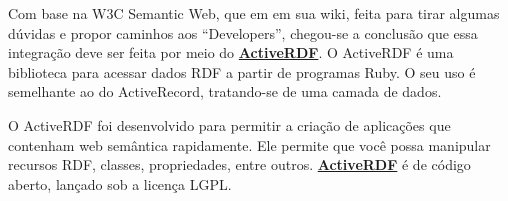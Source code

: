 	Com base na W3C Semantic Web, que em em sua wiki, feita para tirar algumas dúvidas e propor caminhos aos “Developers”, chegou-se a conclusão que essa integração deve ser feita por meio do \href{http://www.w3.org/2001/sw/wiki/SemanticWebTools#Ruby_Developers}{\textbf{ActiveRDF}}. O ActiveRDF  é uma biblioteca para acessar dados RDF a partir de programas Ruby. O seu uso é semelhante ao do ActiveRecord, tratando-se de uma camada de dados. 
	
	O ActiveRDF foi desenvolvido para permitir a criação de aplicações que contenham web semântica rapidamente. Ele permite que você possa manipular recursos RDF, classes, propriedades, entre outros. \href{http://activerdf.org/}{\textbf{ActiveRDF}} é de código aberto, lançado sob a licença LGPL.

